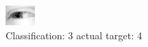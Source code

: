 \begin{figure}[h!]
\begin{center}
\includegraphics[width=0.60\columnwidth]{figures/ID2537_class_3_target_4.png}
\end{center}
\caption{ Classification: 3 actual target: 4}
\label{fig:ID2537_class_3_target_4}
\end{figure}
